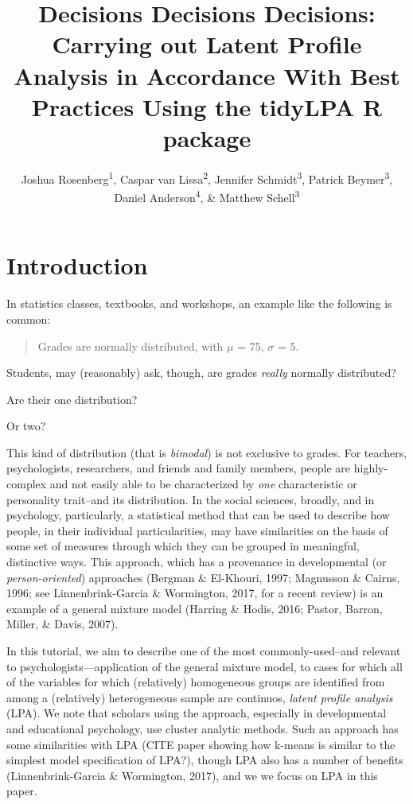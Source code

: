 \documentclass[man]{apa6}
\affiliation{
\vspace{0.5cm}
\textsuperscript{1} University of Tennessee, Knoxville\\\textsuperscript{2} Utrecht University\\\textsuperscript{3} Michigan State University\\\textsuperscript{4} University of Oregon\\\textsuperscript{5} }
\title{Decisions Decisions Decisions: Carrying out Latent Profile Analysis in Accordance With Best Practices Using the tidyLPA R package}
\author{Joshua Rosenberg\textsuperscript{1}, Caspar van Lissa\textsuperscript{2}, Jennifer Schmidt\textsuperscript{3}, Patrick Beymer\textsuperscript{3}, Daniel Anderson\textsuperscript{4}, \& Matthew Schell\textsuperscript{3}}
\date{}
\begin{document}
\maketitle

\hypertarget{introduction}{%
\section{Introduction}\label{introduction}}

In statistics classes, textbooks, and workshops, an example like the following is common:

\begin{quote}
Grades are normally distributed, with \(\mu\) = 75, \(\sigma\) = 5.
\end{quote}

Students, may (reasonably) ask, though, are grades \emph{really} normally distributed?

Are their one distribution?

Or two?

This kind of distribution (that is \emph{bimodal}) is not exclusive to grades. For
teachers, psychologists, researchers, and friends and family members, people are
highly-complex and not easily able to be characterized by \emph{one} characteristic
or personality trait--and its distribution. In the social sciences, broadly, and
in psychology, particularly, a statistical method that can be used to describe
how people, in their individual particularities, may have similarities on the
basis of some set of measures through which they can be grouped in meaningful,
distinctive ways. This approach, which has a provenance in developmental (or
\emph{person-oriented}) approaches (Bergman \& El-Khouri, 1997; Magnusson \&
Cairns, 1996; see Linnenbrink-Garcia \& Wormington, 2017, for a recent review) is
an example of a general mixture model (Harring \& Hodis, 2016; Pastor, Barron,
Miller, \& Davis, 2007).

In this tutorial, we aim to describe one of the most commonly-used--and relevant
to psychologists---application of the general mixture model, to cases for which
all of the variables for which (relatively) homogeneous groups are identified
from among a (relatively) heterogeneous sample are continuos, \emph{latent profile
analysis} (LPA). We note that scholars using the approach, especially in
developmental and educational psychology, use cluster analytic methods. Such an
approach has some similarities with LPA (CITE paper showing how k-means is
similar to the simplest model specification of LPA?), though LPA also has a
number of benefits (Linnenbrink-Garcia \& Wormington, 2017), and we we focus on
LPA in this paper.
\end{document}
